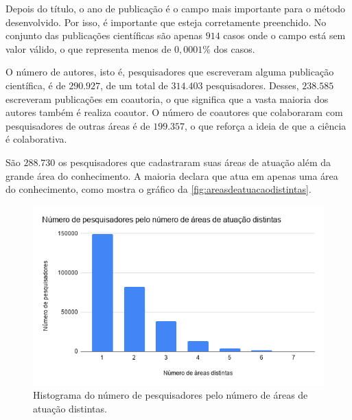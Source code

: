 Depois do título, o ano de publicação é o campo mais importante para o método desenvolvido. Por isso, é importante que esteja corretamente preenchido. No conjunto das publicações científicas são apenas $914$ casos onde o campo está sem valor válido, o que representa menos de $0,0001$\% dos casos.

O número de autores, isto é, pesquisadores que escreveram alguma publicação científica, é de $290.927$, de um total de $314.403$ pesquisadores. Desses, $238.585$ escreveram publicações em coautoria, o que significa que a vasta maioria dos autores também é realiza coautor. O número de coautores que colaboraram com pesquisadores de outras áreas é de $199.357$, o que reforça a ideia de que a ciência é colaborativa.

São $288.730$ os pesquisadores que cadastraram suas áreas de atuação além da grande área do conhecimento. A maioria declara que atua em apenas uma área do conhecimento, como mostra o gráfico da \autoref{fig:areasdeatuacaodistintas}.

\begin{figure}[htpb]
  \centering
  \includegraphics[width=.8\textwidth]{figuras/conjuntodedados-numero-de-areas-distintas}
  \caption{Histograma do número de pesquisadores pelo número de áreas de atuação distintas.}
  \label{fig:areasdeatuacaodistintas}
\end{figure}
